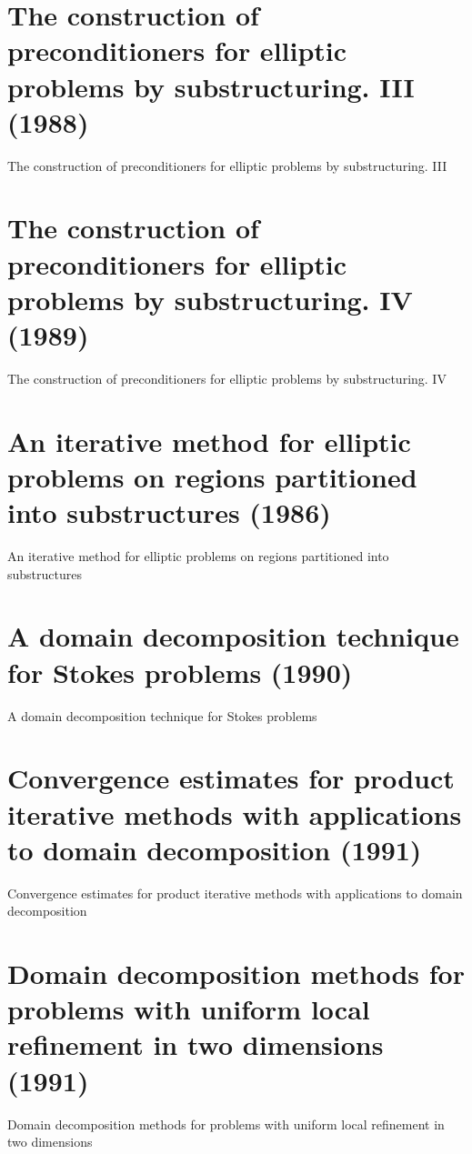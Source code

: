 \section{The construction of preconditioners for elliptic problems by substructuring. III (1988)}
The construction of preconditioners for elliptic problems by substructuring. III \cite{bramble1988construction}


\section{The construction of preconditioners for elliptic problems by substructuring. IV (1989)}
The construction of preconditioners for elliptic problems by substructuring. IV \cite{bramble1989construction}


\section{An iterative method for elliptic problems on regions partitioned into substructures (1986)}
An iterative method for elliptic problems on regions partitioned into substructures \cite{bramble1986construction}


\section{A domain decomposition technique for Stokes problems (1990)}
A domain decomposition technique for Stokes problems \cite{bramble1990domain}


\section{Convergence estimates for product iterative methods with applications to domain decomposition (1991)}
Convergence estimates for product iterative methods with applications to domain decomposition \cite{bramble1991convergenceb}


\section{Domain decomposition methods for problems with uniform local refinement in two dimensions (1991)}
Domain decomposition methods for problems with uniform local refinement in two dimensions \cite{bramble1991domain}


